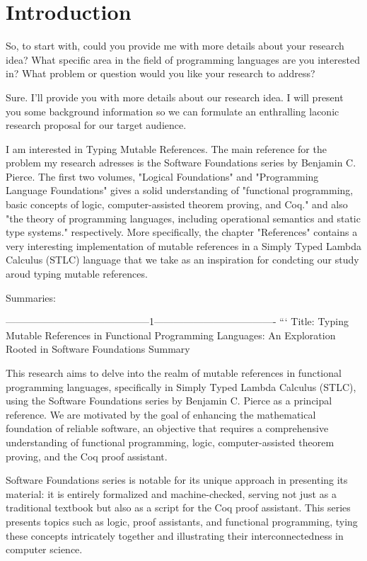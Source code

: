 
\chapter{Introduction}

So, to start with, could you provide me with more details about your research idea? What specific area in the field of programming languages are you interested in? What problem or question would you like your research to address?

Sure. I'll provide you with more details about our research idea. I will present you some background information so we can formulate an enthralling laconic research proposal for our target audience.

I am interested in Typing Mutable References. The main reference for the problem my research adresses is the Software Foundations series by Benjamin C. Pierce. The first two volumes, "Logical Foundations" and "Programming Language Foundations" gives a solid understanding of "functional programming, basic concepts of logic, computer-assisted theorem proving, and Coq." and also "the theory of programming languages, including operational semantics and static type systems." respectively. More specifically, the chapter "References" contains a very interesting implementation of mutable references in a Simply Typed Lambda Calculus (STLC) language that we take as an inspiration for condcting our study aroud typing mutable references.


Summaries:

--------------------------------------------1-------------------------------------
```
Title: Typing Mutable References in Functional Programming Languages: An Exploration Rooted in Software Foundations
Summary

This research aims to delve into the realm of mutable references in functional programming languages, specifically in Simply Typed Lambda Calculus (STLC), using the Software Foundations series by Benjamin C. Pierce as a principal reference. We are motivated by the goal of enhancing the mathematical foundation of reliable software, an objective that requires a comprehensive understanding of functional programming, logic, computer-assisted theorem proving, and the Coq proof assistant.

Software Foundations series is notable for its unique approach in presenting its material: it is entirely formalized and machine-checked, serving not just as a traditional textbook but also as a script for the Coq proof assistant. This series presents topics such as logic, proof assistants, and functional programming, tying these concepts intricately together and illustrating their interconnectedness in computer science.


